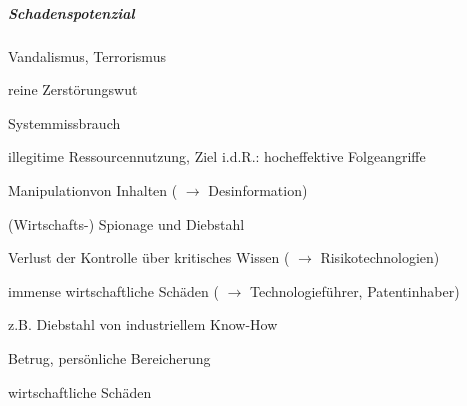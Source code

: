 \documentclass[a4paper]{article}
\begin{document}
\begin{multicols}{3}
    \subparagraph{Schadenspotenzial}

    \begin{enumerate*}
        \item
        Vandalismus, Terrorismus
    \end{enumerate*}

    \begin{itemize*}
        \item
        reine Zerstörungswut
    \end{itemize*}

    \begin{enumerate*}
        \setcounter{enumi}{1}
        \item
        Systemmissbrauch
    \end{enumerate*}

    \begin{itemize*}
        \item
        illegitime Ressourcennutzung, Ziel i.d.R.: hocheffektive Folgeangriffe
        \item
        Manipulationvon Inhalten ( $\rightarrow$
        Desinformation)
    \end{itemize*}

    \begin{enumerate*}
        \setcounter{enumi}{2}
        \item
              (Wirtschafts-) Spionage und Diebstahl
    \end{enumerate*}

    \begin{itemize*}
        \item
        Verlust der Kontrolle über kritisches Wissen
        ( $\rightarrow$ Risikotechnologien)
        \item
        immense wirtschaftliche Schäden ( $\rightarrow$
        Technologieführer, Patentinhaber)
        \item
        z.B. Diebstahl von industriellem Know-How
    \end{itemize*}

    \begin{enumerate*}
        \setcounter{enumi}{3}
        \item
        Betrug, persönliche Bereicherung
    \end{enumerate*}

    \begin{itemize*}
        \item
        wirtschaftliche Schäden
    \end{itemize*}


\end{multicols}
\end{document}

